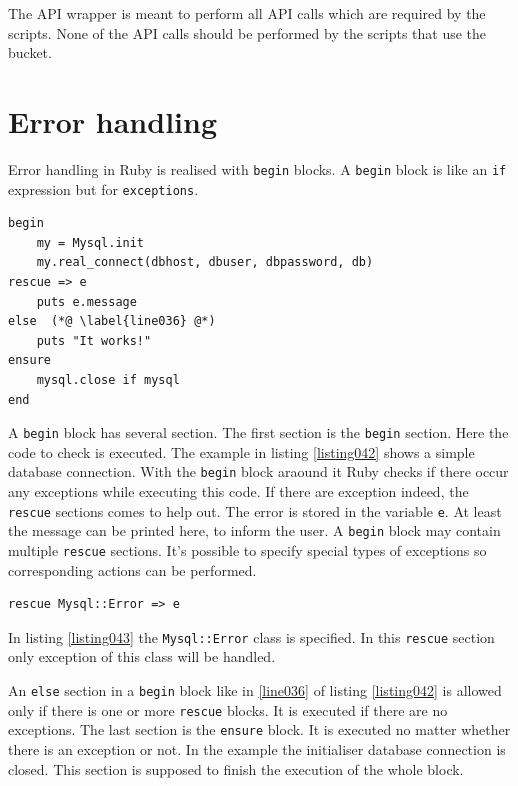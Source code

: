  The API wrapper is meant to perform all API calls which are required by the scripts. None of the API calls should be performed by the scripts that use the bucket.

\section{Error handling}

Error handling in Ruby is realised with \lstinline{begin} blocks. A \lstinline{begin} block is like an \lstinline{if} expression but for \lstinline{exceptions}. 

\begin{lstlisting}[aboveskip=1\baselineskip, caption=Error handling with \lstinline{begin} blocks., label=listing042]
begin
	my = Mysql.init
	my.real_connect(dbhost, dbuser, dbpassword, db)
rescue => e
	puts e.message
else  (*@ \label{line036} @*)
	puts "It works!"
ensure
	mysql.close if mysql
end
\end{lstlisting}

A \lstinline{begin} block has several section. The first section is the \lstinline{begin} section. Here the code to check is executed. The example in listing \ref{listing042} shows a simple database connection. With the \lstinline{begin} block araound it Ruby checks if there occur any exceptions while executing this code. If there are exception indeed, the \lstinline{rescue} sections comes to help out. The error is stored in the variable \lstinline{e}. At least the message can be printed here, to inform the user. A \lstinline{begin} block may contain multiple \lstinline{rescue} sections. It's possible to specify special types of exceptions so corresponding actions can be performed. 

\begin{lstlisting}[aboveskip=1\baselineskip, caption=\texttt{joomlaMultiple.rb} usage., label=listing043]
rescue Mysql::Error => e
\end{lstlisting}

In listing \ref{listing043} the \lstinline{Mysql::Error} class is specified. In this \lstinline{rescue} section only exception of this class will be handled.

An \lstinline{else} section in a \lstinline{begin} block like in \ref{line036} of listing \ref{listing042} is allowed only if there is one or more \lstinline{rescue} blocks. It is executed if there are no exceptions. The last section is the \lstinline{ensure} block. It is executed no matter whether there is an exception or not. In the example the initialiser database connection is closed. This section is supposed to finish the execution of the whole block.


